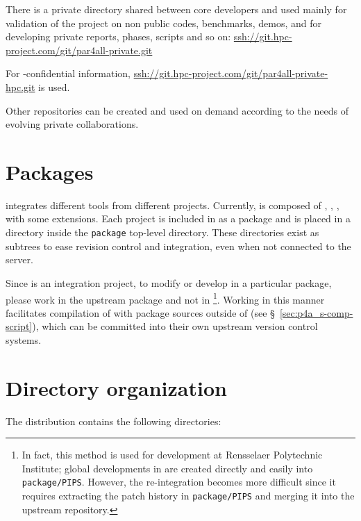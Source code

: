\documentclass[a4paper]{article}
\begin{document}
There is a private directory shared between core developers and used mainly
for validation of the project on non public codes, benchmarks, demos,
and for developing private reports, phases, scripts and so on:
\url{ssh://git.hpc-project.com/git/par4all-private.git}

For \Ahpcp-confidential information,
\url{ssh://git.hpc-project.com/git/par4all-private-hpc.git} is used.

Other repositories can be created and used on demand according to the
needs of evolving private collaborations.

\section{Packages}
\label{sec:packages}

\Apfa integrates different tools from different projects. Currently, \Apfa
is composed of \Apips, \Apipsgfc, \Apolylib, with some extensions. Each
project is included in \Apfa as a package and is placed in a directory
inside the \texttt{package} top-level directory.
These directories exist as \Agit subtrees to ease revision control and
integration, even when not connected to the \Asvn server.

Since \Apfa is an integration project, to modify or develop in
a particular package, please work in the upstream package and not in
\Apfa\footnote{In fact, this method is used for \Apfa development at Rensselaer
  Polytechnic Institute; global developments in \Apips are created
  directly and easily into \texttt{package/PIPS}. However,
  the re-integration becomes more difficult since it requires extracting the
  patch history in \texttt{package/PIPS} and merging it into the \Apips
  upstream \Asvn repository.}. Working in this manner facilitates
compilation of \Apfa with package sources outside of \Apfa (see
\S~\ref{sec:p4a_s-comp-script}), which can be committed into their own upstream
version control systems.


\section{Directory organization}
\label{sec:direct-organ}
The \Apfa distribution contains the following directories:
\end{document}
